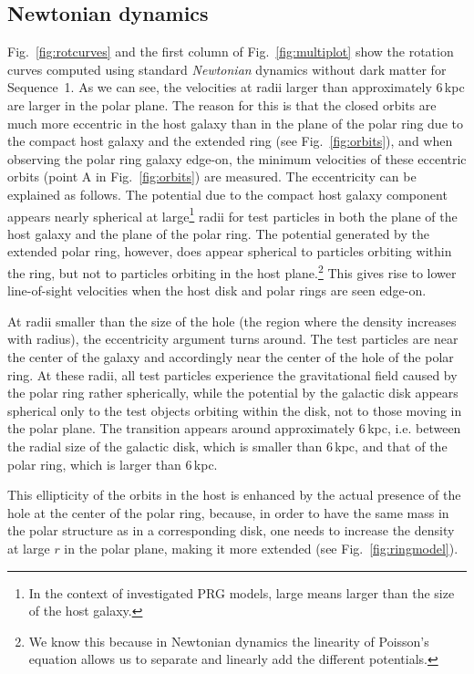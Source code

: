 \documentclass[useAMS,usenatbib]{mn2e}
\begin{document}
\subsection{Newtonian dynamics}
Fig.~\ref{fig:rotcurves} and the first column of Fig.~\ref{fig:multiplot} show the rotation curves computed using standard {\it Newtonian} dynamics without dark matter for Sequence~1. As we can see, the velocities at radii larger than approximately 6\,kpc are larger in the polar plane. The reason for this is that the closed orbits are much more eccentric in the host galaxy than in the plane of the polar ring due to the compact host galaxy and the extended ring (see Fig.~\ref{fig:orbits}), and when observing the polar ring galaxy edge-on, the minimum velocities of these eccentric orbits (point A in Fig.~\ref{fig:orbits}) are measured.
The eccentricity can be explained as follows. The potential due to the compact host galaxy component appears nearly spherical at large\footnote{In the context of investigated PRG models, large means larger than the size of the host galaxy.} radii for test particles in both the plane of the host galaxy and the plane of the polar ring. The potential generated by the extended polar ring, however, does appear spherical to particles orbiting within the ring, but not to particles orbiting in the host plane.\footnote{We know this because in Newtonian dynamics the linearity of Poisson's equation allows us to separate and linearly add the different potentials.}
This gives rise to lower line-of-sight velocities when the host disk and polar rings are seen edge-on.

At radii smaller than the size of the hole (the region where the density increases with radius), the eccentricity argument turns around. The test particles are near the center of the galaxy and accordingly near the center of the hole of the polar ring. At these radii, all test particles experience the gravitational field caused by the polar ring rather spherically, while the potential by the galactic disk appears spherical only to the test objects orbiting within the disk, not to those moving in the polar plane.
The transition appears around approximately 6\,kpc, i.e. between the radial size of the galactic disk, which is smaller than 6\,kpc, and that of the polar ring, which is larger than 6\,kpc.

This ellipticity of the orbits in the host is enhanced by the actual presence of the hole at the center of the polar ring, because, in order to have the same mass in the polar structure as in a corresponding disk, one needs to increase the density at large $r$ in the polar plane, making it more extended (see Fig.~\ref{fig:ringmodel}).
\end{document}
